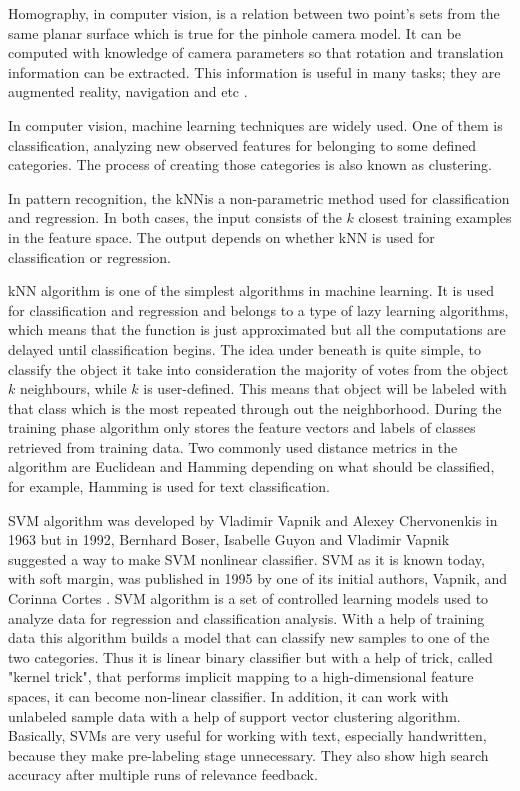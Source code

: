 \documentclass[../../../../main]{subfiles}
\begin{document}
Homography, in computer vision, is a relation between two point's sets from the same planar surface which is true for the pinhole camera model. It can be computed with knowledge of camera parameters so that rotation and translation information can be extracted. This information is useful in many tasks; they are augmented reality, navigation and etc \cite{opencv_docs_feature_matching_homography}.

In computer vision, machine learning techniques are widely used. One of them is classification, analyzing new observed features for belonging to some defined categories. The process of creating those categories is also known as clustering.

In pattern recognition, the \ac{kNN}is a non-parametric method used for classification and regression. In both cases, the input consists of the $k$ closest training examples in the feature space. The output depends on whether \ac{kNN} is used for classification or regression.

\ac{kNN} algorithm is one of the simplest algorithms in machine learning. It is used for classification and regression and belongs to a type of lazy learning algorithms, which means that the function is just approximated but all the computations are delayed until classification begins. The idea under beneath is quite simple, to classify the object it take into consideration the majority of votes from the object $k$ neighbours, while $k$ is user-defined. This means that object will be labeled with that class which is the most repeated through out the neighborhood.
During the training phase algorithm only stores the feature vectors and labels of classes retrieved from training data. 
Two commonly used distance metrics in the algorithm are Euclidean and Hamming depending on what should be classified, for example, Hamming is used for text classification.

\ac{SVM} algorithm was developed by Vladimir Vapnik and Alexey Chervonenkis in 1963 but in 1992, Bernhard Boser, Isabelle Guyon and Vladimir Vapnik suggested a way to make \ac{SVM} nonlinear classifier. \ac{SVM} as it is known today, with soft margin, was published in 1995 by one of its initial authors, Vapnik, and Corinna Cortes \cite{support_vector_networks_vapnik}. \ac{SVM} algorithm is a set of controlled learning models used to analyze data for regression and classification analysis. With a help of training data this algorithm builds a model that can classify new samples to one of the two categories. Thus it is linear binary classifier but with a help of trick, called "kernel trick", that performs implicit mapping to a high-dimensional feature spaces, it can become non-linear classifier. In addition, it can work with unlabeled sample data with a help of support vector clustering algorithm. Basically, \ac{SVM}s are very useful for working with text, especially handwritten, because they make pre-labeling stage unnecessary. They also show high search accuracy after multiple runs of relevance feedback.
\end{document}
